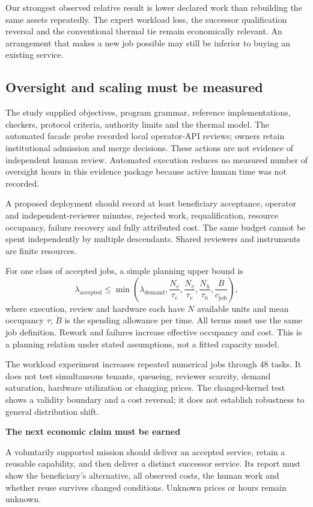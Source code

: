 \documentclass[11pt,a4paper]{article}
\newcommand{\claim}[2]{\begin{tcolorbox}[enhanced,colback=wash,colframe=purple,boxrule=0pt,borderline west={2pt}{0pt}{purple},arc=0pt,left=9pt,right=9pt,top=7pt,bottom=7pt]\sffamily\textbf{#1}\par\smallskip\normalfont #2\end{tcolorbox}}
\begin{document}
Our strongest observed relative result is lower declared work than rebuilding the same assets repeatedly. The expert workload loss, the successor qualification reversal and the conventional thermal tie remain economically relevant. An arrangement that makes a new job possible may still be inferior to buying an existing service.

\subsection{Oversight and scaling must be measured}
The study supplied objectives, program grammar, reference implementations, checkers, protocol criteria, authority limits and the thermal model. The automated facade probe recorded local operator-API reviews; owners retain institutional admission and merge decisions. These actions are not evidence of independent human review. Automated execution reduces no measured number of oversight hours in this evidence package because active human time was not recorded.

A proposed deployment should record at least beneficiary acceptance, operator and independent-reviewer minutes, rejected work, requalification, resource occupancy, failure recovery and fully attributed cost. The same budget cannot be spent independently by multiple descendants. Shared reviewers and instruments are finite resources.

For one class of accepted jobs, a simple planning upper bound is
\begin{equation}
\lambda_{\mathrm{accepted}}\leq
\min\!\left(
\lambda_{\mathrm{demand}},
\frac{N_e}{\tau_e},
\frac{N_v}{\tau_v},
\frac{N_h}{\tau_h},
\frac{\dot B}{c_{\mathrm{job}}}
\right),
\label{eq:capacity}
\end{equation}
where execution, review and hardware each have \(N\) available units and mean occupancy \(\tau\); \(\dot B\) is the spending allowance per time. All terms must use the same job definition. Rework and failures increase effective occupancy and cost. This is a planning relation under stated assumptions, not a fitted capacity model.

The workload experiment increases repeated numerical jobs through 48 tasks. It does not test simultaneous tenants, queueing, reviewer scarcity, demand saturation, hardware utilization or changing prices. The changed-kernel test shows a validity boundary and a cost reversal; it does not establish robustness to general distribution shift.

\claim{The next economic claim must be earned}{A voluntarily supported mission should deliver an accepted service, retain a reusable capability, and then deliver a distinct successor service. Its report must show the beneficiary's alternative, all observed costs, the human work and whether reuse survives changed conditions. Unknown prices or hours remain unknown.}
\end{document}
